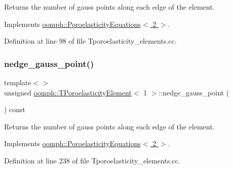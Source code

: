 Returns the number of gauss points along each edge of the element. 



Implements \hyperlink{classoomph_1_1PoroelasticityEquations_aa01b0fb38667776634b5f33bf8859886}{oomph\+::\+Poroelasticity\+Equations$<$ 2 $>$}.



Definition at line 98 of file Tporoelasticity\+\_\+elements.\+cc.

\mbox{\label{classoomph_1_1TPoroelasticityElement_a8dabd82d779752499883ac3fdd36d5d3}} 
\subsubsection{\texorpdfstring{nedge\+\_\+gauss\+\_\+point()}{nedge\_gauss\_point()}\hspace{0.1cm}{\footnotesize\ttfamily [2/3]}}
{\footnotesize\ttfamily template$<$$>$ \\
unsigned \hyperlink{classoomph_1_1TPoroelasticityElement}{oomph\+::\+T\+Poroelasticity\+Element}$<$ 1 $>$\+::nedge\+\_\+gauss\+\_\+point (\begin{DoxyParamCaption}{ }\end{DoxyParamCaption}) const\hspace{0.3cm}{\ttfamily [virtual]}}



Returns the number of gauss points along each edge of the element. 



Implements \hyperlink{classoomph_1_1PoroelasticityEquations_aa01b0fb38667776634b5f33bf8859886}{oomph\+::\+Poroelasticity\+Equations$<$ 2 $>$}.



Definition at line 238 of file Tporoelasticity\+\_\+elements.\+cc.

\mbox{\label{classoomph_1_1TPoroelasticityElement_a43bec0e682f98fd6961cd02bd469dac2}} 
